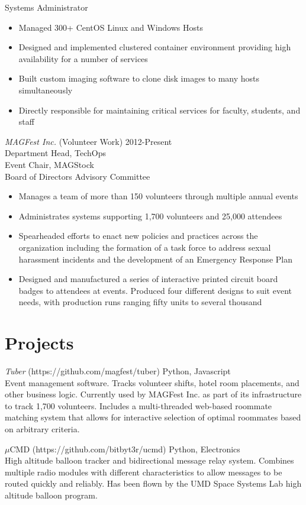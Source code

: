 \documentclass[line]{resume}
\begin{document}
\begin{resume}
    Systems Administrator
    \begin{itemize}
      \item Managed 300+ CentOS Linux and Windows Hosts
      \item Designed and implemented clustered container environment providing high availability for a number of services
      \item Built custom imaging software to clone disk images to many hosts simultaneously
      \item Directly responsible for maintaining critical services for faculty, students, and staff
      \end{itemize}
  {\sl MAGFest Inc.} (Volunteer Work) \hfill 2012-Present \\
    Department Head, TechOps \\
    Event Chair, MAGStock \\
    Board of Directors Advisory Committee
    \begin{itemize}
      \item Manages a team of more than 150 volunteers through multiple annual events
      \item Administrates systems supporting 1,700 volunteers and 25,000 attendees
      \item Spearheaded efforts to enact new policies and practices across the organization including the formation of a task force to address sexual harassment incidents and the development of an Emergency Response Plan
      \item Designed and manufactured a series of interactive printed circuit board badges to attendees at events. Produced four different designs to suit event needs, with production runs ranging fifty units to several thousand
    \end{itemize}
    
\section{Projects}
    {\sl Tuber} (https://github.com/magfest/tuber) \hfill Python, Javascript \\
        Event management software. Tracks volunteer shifts, hotel room placements, and other business logic. Currently used by MAGFest Inc. as part of its infrastructure to track 1,700 volunteers. Includes a multi-threaded web-based roommate matching system that allows for interactive selection of optimal roommates based on arbitrary criteria.
        
    $\mu$CMD (https://github.com/bitbyt3r/ucmd) \hfill Python, Electronics \\
        High altitude balloon tracker and bidirectional message relay system. Combines multiple radio modules with different characteristics to allow messages to be routed quickly and reliably. Has been flown by the UMD Space Systems Lab high altitude balloon program.
        

\end{resume}
\end{document}

